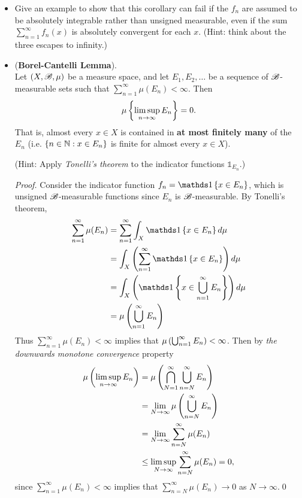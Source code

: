 \documentclass[11pt]{article}
\begin{document}
\begin{itemize}
\item \begin{exercise}
Give an example to show that this corollary can fail if the $f_n$ are assumed to be absolutely integrable rather than unsigned measurable, even if the sum $\sum_{n=1}^{\infty} f_n(x)$ is absolutely convergent for each $x$. (Hint: think about the three escapes to infinity.)
\end{exercise}

\item \begin{lemma} (\textbf{Borel-Cantelli Lemma}). \citep{tao2011introduction, resnick2013probability} \\
Let $(X, {\mathscr B}, \mu)$ be a measure space, and let $E_1, E_2,  \ldots$ be a sequence of ${\mathscr B}$-measurable sets such that $\sum_{n=1}^{\infty}\mu(E_n) < \infty$. Then 
\begin{align*}
\mu\left\{ \limsup\limits_{n\rightarrow \infty} E_{n} \right\}  = 0.
\end{align*} That is,  almost every $x \in X$ is contained in \textbf{at most finitely many} of the $E_n$ (i.e. $\left\{ n \in {\mathbb N} : x \in E_n\right\}$ is finite for almost every $x \in X$).
\end{lemma}  (Hint: Apply \emph{Tonelli's theorem} to the indicator functions $\mathds{1}_{E_n}$.)
\begin{proof}
Consider the indicator function $f_n = \ind{x \in E_n}$, which is unsigned ${\mathscr B}$-measurable functions since $E_n$ is ${\mathscr B}$-measurable. By Tonelli's theorem, 
\begin{align*}
\sum_{n=1}^{\infty}\mu(E_n)  &= \sum_{n=1}^{\infty}\int_{X}\ind{x \in E_n} d\mu \\
&= \int_{X}\paren{\sum_{n=1}^{\infty}\ind{x \in E_n}} d\mu \\
&= \int_{X}\paren{\ind{x \in \bigcup_{n=1}^{\infty}E_n}} d\mu \\
&= \mu\paren{\bigcup_{n=1}^{\infty}E_n}
\end{align*} Thus $\sum_{n=1}^{\infty}\mu(E_n) < \infty$ implies that $\mu\left(\bigcup_{n=1}^{\infty}E_n\right) < \infty$. Then by \emph{the downwards monotone convergence} property
\begin{align*}
\mu\left( \limsup\limits_{n\rightarrow \infty} E_{n} \right) &= \mu\left(\bigcap_{N=1}^{\infty}\bigcup_{n=N}^{\infty}E_n\right) \\
&= \lim\limits_{N\rightarrow \infty}\mu\left(\bigcup_{n=N}^{\infty}E_n\right) \\
&= \lim\limits_{N\rightarrow \infty}\sum_{n=N}^{\infty}\mu(E_n) \\
&\le  \limsup\limits_{N\rightarrow \infty}\sum_{n=N}^{\infty}\mu(E_{n}) = 0,
\end{align*}
since $\sum_{n=1}^{\infty}\mu(E_{n})<\infty$ implies that $\sum_{n=N}^{\infty}\mu(E_{n}) \rightarrow 0$ as $N\rightarrow \infty$.\qed
\end{proof}




\end{itemize}
\end{document}
